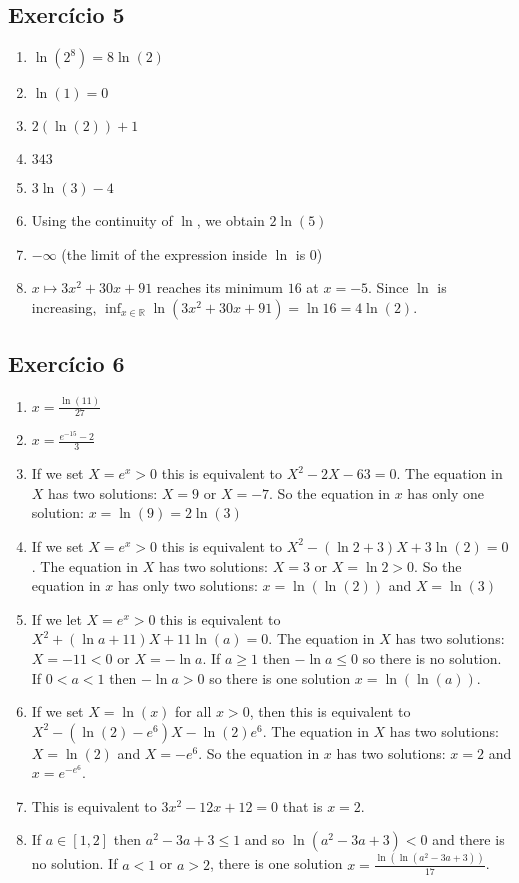\subsection*{Exercício 5}

\begin{enumerate}
\item $\ln{(2^{8})} = 8 \ln{(2)}$
\item $\ln{(1)} = 0$
\item $2{(\ln{(2)}) + 1}$
\item $343$
\item $3\ln{(3)} - 4$
\item Using the continuity of $\ln$, we obtain $2\ln{(5)}$
\item $-\infty$ (the limit of the expression inside $\ln$ is $0$)
\item $x \mapsto 3x^2+30x+91$ reaches its minimum $16$ at $x=-5$. Since
  $\ln$ is increasing, $\inf_{x \in \mathbb R} {\ln(3x^2+30x+91)} =
  \ln{16} = 4\ln{(2)}$.
\end{enumerate}

\subsection*{Exercício 6}

\begin{enumerate}
\item $x = \frac{\ln{(11)}}{27}$
\item $x = \frac{e^{-15} - 2}{3}$
\item If we set $X = e^{x} > 0$ this is equivalent to $X^2 -2X - 63 = 0$.
  The equation in $X$ has two solutions: $X=9$ or $X=-7$. So the equation
  in $x$ has only one solution: $x = \ln{(9)} = 2\ln{(3)}$
\item If we set $X = e^{x} > 0$ this is equivalent to
  $X^2 - {(\ln{2} + 3)}X + 3 \ln{(2)} = 0$.
  The equation in $X$ has two solutions: $X=3$ or $X=\ln{2} > 0$.
  So the equation
  in $x$ has only two solutions: $x = \ln{(\ln{(2)})}$ and $X=\ln{(3)}$
\item If we let $X = e^{x} > 0$ this is equivalent to
  $X^2 + {(\ln{a} + 11)}X + 11 \ln{(a)} = 0$.
  The equation in $X$ has two solutions: $X=-11 < 0$ or $X=-\ln{a}$.
  If $a \geq 1$ then $-\ln{a} \leq 0$ so there is no solution.
  If $0 < a < 1$ then $-\ln{a} > 0$ so there is one solution
  $x = \ln{(\ln{(a)})}$.
\item If we set $X = \ln{(x)}$ for all $x > 0$, then this is equivalent to
  $X^2 - {(\ln{(2)}-e^6)} X -\ln{(2)}e^6$. The equation in $X$ has two
  solutions: $X = \ln{(2)}$ and $X = -e^6$.
  So the equation in $x$ has two solutions:
  $x = 2$ and $x = e^{-{e^6}}$.
\item This is equivalent to $3x^2 - 12x + 12 = 0$ that is
  $x = 2$.
\item If $a \in [1,2]$ then $a^2-3a+3 \leq 1$ and so
  $\ln{\left(a^2-3a+3\right)} < 0$ and there is no solution.
  If $a < 1$ or $a > 2$,
  there is one solution $x = \frac{\ln{(\ln{\left(a^2-3a+3\right)})}}{17}$.
\end{enumerate}

